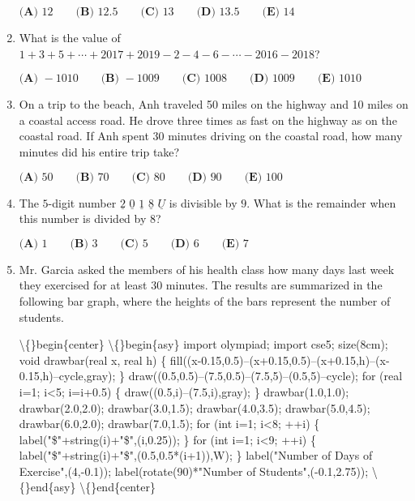 \documentclass{article}
\begin{document}
\begin{enumerate}[label=\arabic*., itemsep=0.5em]
\(\textbf{(A) } 12 \qquad \textbf{(B) } 12.5 \qquad \textbf{(C) } 13 \qquad \textbf{(D) } 13.5 \qquad \textbf{(E) } 14\)\par \vspace{0.5em}\item What is the value of \(1+3+5+\cdots+2017+2019-2-4-6-\cdots-2016-2018\)?

\(\textbf{(A) }-1010\qquad\textbf{(B) }-1009\qquad\textbf{(C) }1008\qquad\textbf{(D) }1009\qquad \textbf{(E) }1010\)\par \vspace{0.5em}\item On a trip to the beach, Anh traveled 50 miles on the highway and 10 miles on a coastal access road. He drove three times as fast on the highway as on the coastal road. If Anh spent 30 minutes driving on the coastal road, how many minutes did his entire trip take?

\(\textbf{(A) }50\qquad\textbf{(B) }70\qquad\textbf{(C) }80\qquad\textbf{(D) }90\qquad \textbf{(E) }100\)\par \vspace{0.5em}\item The \(5\)-digit number \(\underline{2}\) \(\underline{0}\) \(\underline{1}\) \(\underline{8}\) \(\underline{U}\) is divisible by \(9\). What is the remainder when this number is divided by \(8\)?

\(\textbf{(A) }1\qquad\textbf{(B) }3\qquad\textbf{(C) }5\qquad\textbf{(D) }6\qquad\textbf{(E) }7\)\par \vspace{0.5em}\item Mr. Garcia asked the members of his health class how many days last week they exercised for at least 30 minutes. The results are summarized in the following bar graph, where the heights of the bars represent the number of students.


\textbackslash\{\}begin\{center\}
\textbackslash\{\}begin\{asy\}
import olympiad;
import cse5;
size(8cm);
void drawbar(real x, real h) \{
  fill((x-0.15,0.5)--(x+0.15,0.5)--(x+0.15,h)--(x-0.15,h)--cycle,gray);
\}
draw((0.5,0.5)--(7.5,0.5)--(7.5,5)--(0.5,5)--cycle);
for (real i=1; i<5; i=i+0.5) \{
  draw((0.5,i)--(7.5,i),gray);
\}
drawbar(1.0,1.0);
drawbar(2.0,2.0);
drawbar(3.0,1.5);
drawbar(4.0,3.5);
drawbar(5.0,4.5);
drawbar(6.0,2.0);
drawbar(7.0,1.5);
for (int i=1; i<8; ++i) \{
  label("\$"+string(i)+"\$",(i,0.25));
\}
for (int i=1; i<9; ++i) \{
  label("\$"+string(i)+"\$",(0.5,0.5*(i+1)),W);
\}
label("Number of Days of Exercise",(4,-0.1));
label(rotate(90)*"Number of Students",(-0.1,2.75));
\textbackslash\{\}end\{asy\}
\textbackslash\{\}end\{center\}


\end{enumerate}
\end{document}
